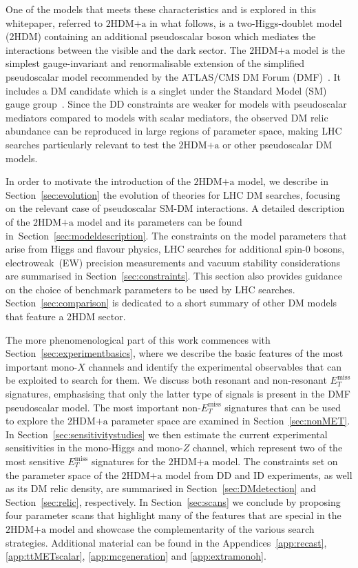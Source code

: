\documentclass[a4paper, 11pt,notoc]{article}
\newcommand{\MET}{\ensuremath{E_T^\mathrm{miss}}\xspace}
\newcommand{\hdma}{\ensuremath{\textrm{2HDM+a}}\xspace}
\begin{document}
One of the models that meets these characteristics and is explored in this whitepaper,  referred to \hdma in what follows,  is a two-Higgs-doublet model (2HDM) containing an additional pseudoscalar boson which mediates the interactions between the visible and the dark sector.  The \hdma model is the simplest gauge-invariant and renormalisable extension of the  simplified pseudoscalar model recommended by the ATLAS/CMS DM Forum (DMF)~\cite{Abercrombie:2015wmb}. It includes a  DM candidate which is a singlet under the Standard Model (SM) gauge group~\cite{Ipek:2014gua,No:2015xqa,Goncalves:2016iyg,Bauer:2017ota,Tunney:2017yfp}.  Since the DD constraints are weaker for models with pseudoscalar mediators compared to models with scalar mediators, the observed DM relic abundance can be reproduced in large regions of parameter space, making LHC searches particularly relevant to test the \hdma or other pseudoscalar DM models.

In order to motivate the introduction of the \hdma model, we describe in Section~\ref{sec:evolution} the evolution of theories for LHC DM searches, focusing on the relevant case of pseudoscalar SM-DM interactions. A detailed description of the \hdma model and its parameters can be found in~Section~\ref{sec:modeldescription}. The constraints on the model parameters that arise from Higgs and flavour physics, LHC searches for additional spin-0 bosons, electroweak~(EW) precision measurements and vacuum stability considerations are summarised in Section~\ref{sec:constraints}. This section also provides guidance on the choice of benchmark parameters to be used by LHC searches. Section~\ref{sec:comparison} is dedicated to a short summary of other DM models that feature a 2HDM sector. 

The more phenomenological part of this work commences with Section~\ref{sec:experimentbasics}, where we describe the basic features of the most important mono-$X$ channels and identify the experimental observables that can be exploited to search for them. We discuss both resonant and non-resonant $\MET$ signatures, emphasising that only the latter type of signals is present in the DMF pseudoscalar model. The most important non-$\MET$ signatures that can be used to explore the \hdma parameter space  are examined in Section~\ref{sec:nonMET}. In Section~\ref{sec:sensitivitystudies} we then estimate the current experimental sensitivities  in the mono-Higgs and mono-$Z$ channel, which represent two of the most sensitive $\MET$ signatures for the \hdma model. The constraints  set on the parameter space of the \hdma model from DD and ID experiments, as well as its DM relic density, are summarised in Section~\ref{sec:DMdetection} and Section~\ref{sec:relic}, respectively. In Section~\ref{sec:scans} we conclude by proposing four parameter scans that highlight many of the features that are special in the \hdma model and showcase the complementarity of the various search strategies.  Additional material can be found in the Appendices~\ref{app:recast}, \ref{app:ttMETscalar}, \ref{app:mcgeneration} and \ref{app:extramonoh}.
\end{document}
